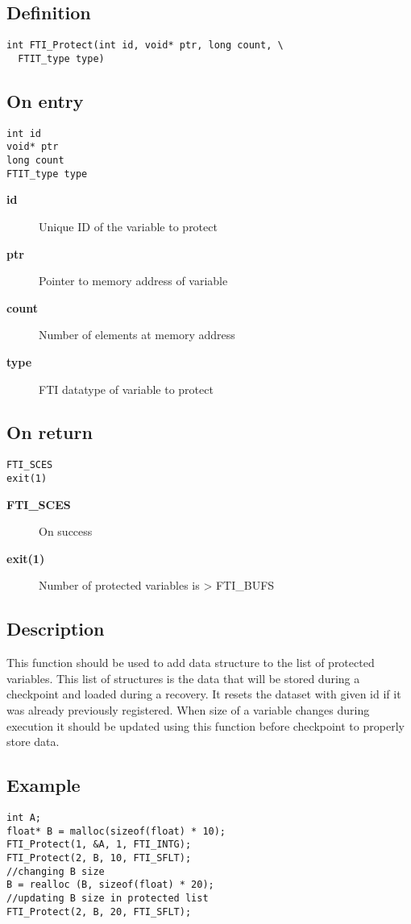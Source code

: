 \documentclass{refrep}
\begin{document}
\subsection*{Definition}
\begin{lstlisting}[frame=single]
int FTI_Protect(int id, void* ptr, long count, \
  FTIT_type type)
\end{lstlisting}
\subsection*{On entry}
\begin{lstlisting}[frame=single]
int id
void* ptr
long count
FTIT_type type
\end{lstlisting}
\begin{description}
\item[\textbf{id}] Unique ID of the variable to protect
\item[\textbf{ptr}] Pointer to memory address of variable
\item[\textbf{count}] Number of elements at memory address
\item[\textbf{type}] FTI datatype of variable to protect
\end{description}
\subsection*{On return}
\begin{lstlisting}[frame=single]
FTI_SCES
exit(1)
\end{lstlisting}
\begin{description}
\item[\textbf{FTI\_SCES}] On success
\item[\textbf{exit(1)}] Number of protected variables is > FTI\_BUFS
\end{description}
\subsection*{Description}
This function should be used to add data structure to the list of protected variables. This list of structures is the data that will be stored during a checkpoint and loaded during a recovery. It resets the dataset with given id if it was already previously registered. When size of a variable changes during execution it should be updated using this function before checkpoint to properly store data.
\subsection*{Example}
\begin{center}
\begin{lstlisting}[frame=single]
int A;
float* B = malloc(sizeof(float) * 10);
FTI_Protect(1, &A, 1, FTI_INTG);
FTI_Protect(2, B, 10, FTI_SFLT);
//changing B size
B = realloc (B, sizeof(float) * 20);
//updating B size in protected list
FTI_Protect(2, B, 20, FTI_SFLT);
\end{lstlisting}
\end{center}
\newpage
\end{document}

